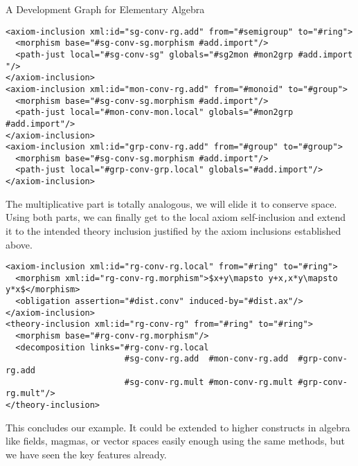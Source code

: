 \begin{omgroup}[id=dg-elal]{A Development Graph for Elementary Algebra}
\begin{lstlisting}[mathescape,index={axiom-inclusion,theory-inclusion}]
<axiom-inclusion xml:id="sg-conv-rg.add" from="#semigroup" to="#ring">
  <morphism base="#sg-conv-sg.morphism #add.import"/>
  <path-just local="#sg-conv-sg" globals="#sg2mon #mon2grp #add.import "/>
</axiom-inclusion>
<axiom-inclusion xml:id="mon-conv-rg.add" from="#monoid" to="#group">
  <morphism base="#sg-conv-sg.morphism #add.import"/>
  <path-just local="#mon-conv-mon.local" globals="#mon2grp #add.import"/>
</axiom-inclusion>
<axiom-inclusion xml:id="grp-conv-rg.add" from="#group" to="#group">
  <morphism base="#sg-conv-sg.morphism #add.import"/>
  <path-just local="#grp-conv-grp.local" globals="#add.import"/>
</axiom-inclusion>
\end{lstlisting}
The multiplicative part is totally analogous, we will elide it to conserve space.
Using both parts, we can finally get to the local axiom self-inclusion and extend
it to the intended theory inclusion justified by the axiom inclusions established
above.
\begin{lstlisting}[mathescape,index={axiom-inclusion,theory-inclusion}]
<axiom-inclusion xml:id="rg-conv-rg.local" from="#ring" to="#ring">
  <morphism xml:id="rg-conv-rg.morphism">$x+y\mapsto y+x,x*y\mapsto y*x$</morphism>
  <obligation assertion="#dist.conv" induced-by="#dist.ax"/>
</axiom-inclusion>  
<theory-inclusion xml:id="rg-conv-rg" from="#ring" to="#ring">
  <morphism base="#rg-conv-rg.morphism"/>
  <decomposition links="#rg-conv-rg.local 
                        #sg-conv-rg.add  #mon-conv-rg.add  #grp-conv-rg.add
                        #sg-conv-rg.mult #mon-conv-rg.mult #grp-conv-rg.mult"/>
</theory-inclusion>  
\end{lstlisting}
This concludes our example. It could be extended to higher constructs in algebra
like fields, magmas, or vector spaces easily enough using the same methods, but
we have seen the key features already.
\end{omgroup}

 


